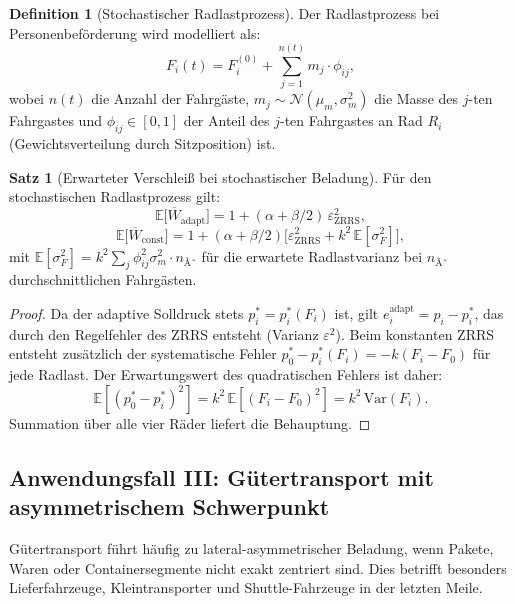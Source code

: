 ﻿\documentclass[a4paper,12pt]{article}
\theoremstyle{definition}
\newtheorem{definition}{Definition}
\newtheorem{satz}{Satz}
\begin{document}
\begin{definition}[Stochastischer Radlastprozess]
Der Radlastprozess bei Personenbeför\-derung wird modelliert als:
\[
    F_i(t) = F^{(0)}_i + \sum_{j=1}^{n(t)} m_j \cdot \phi_{ij},
\]
wobei $n(t)$ die Anzahl der Fahrgäste, $m_j \sim \mathcal{N}(\mu_m, \sigma_m^2)$
die Masse des $j$-ten Fahrgastes und $\phi_{ij} \in [0,1]$ der Anteil des
$j$-ten Fahrgastes an Rad $R_i$ (Gewichtsverteilung durch Sitzposition) ist.
\end{definition}

\begin{satz}[Erwarteter Verschleiß bei stochastischer Beladung]
\label{satz:stoch_person}
Für den stochastischen Radlastprozess gilt:
\[
    \mathbb{E}\bigl[\overline{W}_{\text{adapt}}\bigr] = 1
    + (\alpha + \beta/2)\,\varepsilon^2_{\text{ZRRS}},
\]
\[
    \mathbb{E}\bigl[\overline{W}_{\text{const}}\bigr] = 1
    + (\alpha + \beta/2)\bigl[\varepsilon^2_{\text{ZRRS}}
    + k^2\,\mathbb{E}[\sigma^2_F]\bigr],
\]
mit $\mathbb{E}[\sigma^2_F] = k^2 \sum_{j}\phi_{ij}^2 \sigma_m^2 \cdot n_{\text{Ã˜}}$
für die erwartete Radlastvarianz bei $n_{\text{Ã˜}}$ durchschnittlichen Fahrgästen.
\end{satz}

\begin{proof}
Da der adaptive Solldruck stets $p^*_i = p^*_i(F_i)$ ist, gilt
$e^{\text{adapt}}_i = p_i - p^*_i$, das durch den Regelfehler des ZRRS entsteht
(Varianz $\varepsilon^2$). Beim konstanten ZRRS entsteht zusätzlich der
systematische Fehler $p^*_0 - p^*_i(F_i) = -k(F_i - F_0)$ für jede Radlast.
Der Erwartungswert des quadratischen Fehlers ist daher:
\[
    \mathbb{E}[(p^*_0 - p^*_i)^2] = k^2\,\mathbb{E}[(F_i - F_0)^2]
    = k^2\,\text{Var}(F_i).
\]
Summation über alle vier Räder liefert die Behauptung.
\end{proof}

\subsection{Anwendungsfall III: Gütertransport mit asymmetrischem Schwerpunkt}

Gütertransport führt häufig zu lateral-asymmetrischer Beladung, wenn Pakete,
Waren oder Containersegmente nicht exakt zentriert sind. Dies betrifft besonders
Lieferfahrzeuge, Kleintransporter und Shuttle-Fahrzeuge in der letzten Meile.
\end{document}
